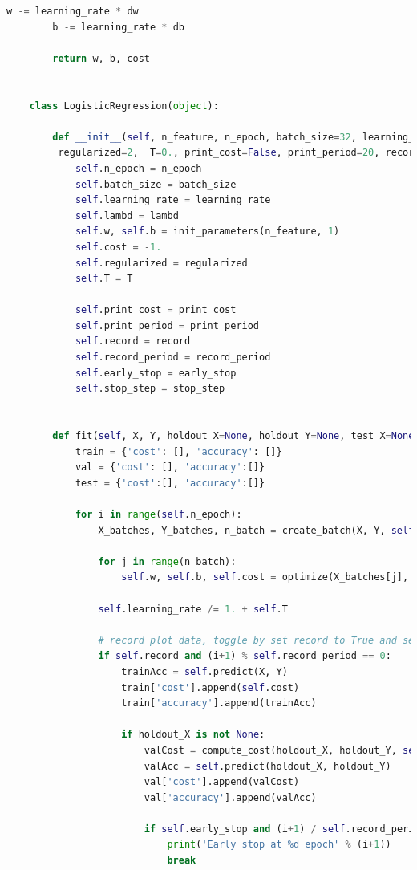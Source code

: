 \documentclass{article}
\begin{document}
\begin{lstlisting}[language=Python, breaklines]
	    w -= learning_rate * dw
	    b -= learning_rate * db
	
	    return w, b, cost
	
	
	class LogisticRegression(object):
	
	    def __init__(self, n_feature, n_epoch, batch_size=32, learning_rate=0.001, lambd=0.01,\
	     regularized=2,  T=0., print_cost=False, print_period=20, record=False, record_period=20, early_stop=False, stop_step=3):
	        self.n_epoch = n_epoch
	        self.batch_size = batch_size
	        self.learning_rate = learning_rate
	        self.lambd = lambd
	        self.w, self.b = init_parameters(n_feature, 1)
	        self.cost = -1.
	        self.regularized = regularized
	        self.T = T
	
	        self.print_cost = print_cost
	        self.print_period = print_period
	        self.record = record
	        self.record_period = record_period
	        self.early_stop = early_stop
	        self.stop_step = stop_step
	
	
	    def fit(self, X, Y, holdout_X=None, holdout_Y=None, test_X=None, test_Y=None):
	        train = {'cost': [], 'accuracy': []}
	        val = {'cost': [], 'accuracy':[]}
	        test = {'cost':[], 'accuracy':[]}
	
	        for i in range(self.n_epoch):
	            X_batches, Y_batches, n_batch = create_batch(X, Y, self.batch_size)
	
	            for j in range(n_batch):
	                self.w, self.b, self.cost = optimize(X_batches[j], Y_batches[j], self.w, self.b, self.learning_rate, self.lambd, self.regularized)
	
	            self.learning_rate /= 1. + self.T
	
	            # record plot data, toggle by set record to True and set record period
	            if self.record and (i+1) % self.record_period == 0:
	                trainAcc = self.predict(X, Y)
	                train['cost'].append(self.cost)
	                train['accuracy'].append(trainAcc)
	
	                if holdout_X is not None:
	                    valCost = compute_cost(holdout_X, holdout_Y, self.w, self.b, self.lambd, self.regularized)
	                    valAcc = self.predict(holdout_X, holdout_Y)
	                    val['cost'].append(valCost)
	                    val['accuracy'].append(valAcc)
	
	                    if self.early_stop and (i+1) / self.record_period > self.stop_step and strictly_increasing(val['cost'][-self.stop_step:]):
	                        print('Early stop at %d epoch' % (i+1))
	                        break
	

\end{lstlisting}
\end{document}
